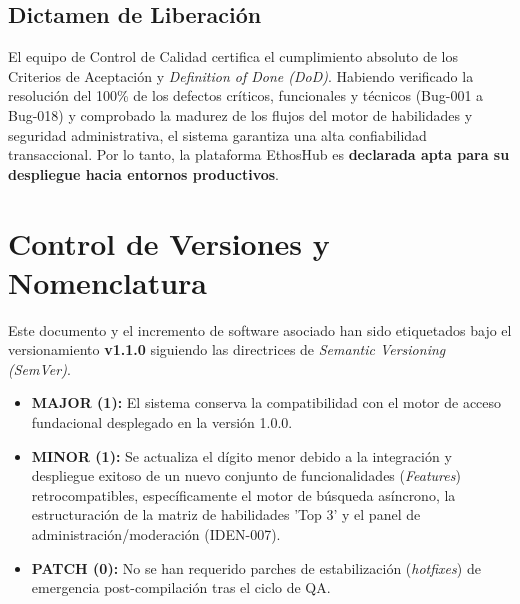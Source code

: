 \clearpage
\subsection{Dictamen de Liberación}
\begin{tcolorbox}[colback=white, colframe=bgPass, boxrule=1.2pt, arc=2pt, title={\faCheckCircle\ \textbf{DICTAMEN: SPRINT EXITOSO Y APROBADO PARA PRODUCCIÓN}}, coltitle=bgPass, fonttitle=\sffamily, attach title to upper=\par\vspace{0.2em}]
\sffamily
El equipo de Control de Calidad certifica el cumplimiento absoluto de los Criterios de Aceptación y \textit{Definition of Done (DoD)}. Habiendo verificado la resolución del 100\% de los defectos críticos, funcionales y técnicos (Bug-001 a Bug-018) y comprobado la madurez de los flujos del motor de habilidades y seguridad administrativa, el sistema garantiza una alta confiabilidad transaccional. Por lo tanto, la plataforma EthosHub es \textbf{declarada apta para su despliegue hacia entornos productivos}.
\end{tcolorbox}

\section{Control de Versiones y Nomenclatura}
\label{sec:versioning_sp2}

Este documento y el incremento de software asociado han sido etiquetados bajo el versionamiento \textbf{v1.1.0} siguiendo las directrices de \textit{Semantic Versioning (SemVer)}.

\begin{itemize}[noitemsep]
    \item \textbf{MAJOR (1):} El sistema conserva la compatibilidad con el motor de acceso fundacional desplegado en la versión 1.0.0.
    \item \textbf{MINOR (1):} Se actualiza el dígito menor debido a la integración y despliegue exitoso de un nuevo conjunto de funcionalidades (\textit{Features}) retrocompatibles, específicamente el motor de búsqueda asíncrono, la estructuración de la matriz de habilidades 'Top 3' y el panel de administración/moderación (IDEN-007).
    \item \textbf{PATCH (0):} No se han requerido parches de estabilización (\textit{hotfixes}) de emergencia post-compilación tras el ciclo de QA.
\end{itemize}